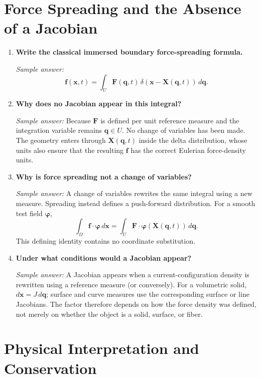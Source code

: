 \documentclass[11pt]{article}
\begin{document}
\section*{Force Spreading and the Absence of a Jacobian}

\begin{enumerate}[label=\arabic*., resume]

\item \textbf{Write the classical immersed boundary force-spreading formula.}

\textit{Sample answer:}
\[
\mathbf{f}(\mathbf{x},t) = \int_U \mathbf{F}(\mathbf{q},t)\,
\delta\!\left(\mathbf{x}-\mathbf{X}(\mathbf{q},t)\right)\,d\mathbf{q}.
\]

\item \textbf{Why does no Jacobian appear in this integral?}

\textit{Sample answer:}
Because $\mathbf{F}$ is defined per unit reference measure and the integration
variable remains $\mathbf{q}\in U$. No change of variables has been made. The
geometry enters through $\mathbf{X}(\mathbf{q},t)$ inside the delta distribution, whose
units also ensure that the resulting $\mathbf{f}$ has the correct Eulerian
force-density units.

\item \textbf{Why is force spreading not a change of variables?}

\textit{Sample answer:}  
A change of variables rewrites the same integral using a new measure. Spreading
instead defines a push-forward distribution. For a smooth test field
$\boldsymbol{\varphi}$,
\[
\int_\Omega\mathbf{f}\cdot\boldsymbol{\varphi}\,d\mathbf{x}
=\int_U\mathbf{F}\cdot
\boldsymbol{\varphi}(\mathbf{X}(\mathbf{q},t))\,d\mathbf{q}.
\]
This defining identity contains no coordinate substitution.

\item \textbf{Under what conditions would a Jacobian appear?}

\textit{Sample answer:}  
A Jacobian appears when a current-configuration density is rewritten using a
reference measure (or conversely). For a volumetric solid,
$d\mathbf{x}=J\,d\mathbf{q}$; surface and curve measures use the corresponding
surface or line Jacobians. The factor therefore depends on how the force density
was defined, not merely on whether the object is a solid, surface, or fiber.

\end{enumerate}

\section*{Physical Interpretation and Conservation}
\end{document}
